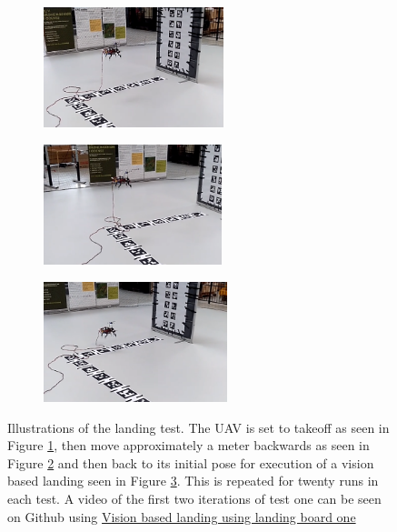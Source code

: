 \documentclass[../Head/report.tex]{subfiles}
\begin{document}
\begin{figure}[H]
    \centering
    \begin{subfigure}[t]{.30\textwidth}
        \centering
        \includegraphics[height=3.5cm]{../Figures/optitrack/optitrack_vision_landing_part_one.png}
        \caption{}
        \label{fig:optitrack_vision_based_landing_landing_station_one_part_one}
    \end{subfigure}
     \hspace{0.2em}
    \begin{subfigure}[t]{.30\textwidth}
        \centering
        \includegraphics[height=3.5cm]{../Figures/optitrack/optitrack_vision_landing_part_two.png}
        \caption{}
        \label{fig:optitrack_vision_based_landing_landing_station_one_part_two}
    \end{subfigure}
     \hspace{-0.03em}
    \begin{subfigure}[t]{.30\textwidth}
        \centering
        \includegraphics[height=3.5cm]{../Figures/optitrack/optitrack_vision_landing_part_three.png}
        \caption{}
        \label{fig:optitrack_vision_based_landing_landing_station_one_part_three}
    \end{subfigure}
    \caption{Illustrations of the landing test. The UAV is set to takeoff as seen in Figure \ref{fig:optitrack_vision_based_landing_landing_station_one_part_one}, then move approximately a meter backwards as seen in Figure \ref{fig:optitrack_vision_based_landing_landing_station_one_part_two} and then back to its initial pose for execution of a vision based landing seen in Figure \ref{fig:optitrack_vision_based_landing_landing_station_one_part_three}. This is repeated for twenty runs in each test.  A video of the first two iterations of test one can be seen on Github using \href{https://github.com/Kenil16/master\_project/blob/master/test\_videos/optitrack/optitrack\_landing\_test\_one.mp4}{Vision based landing using landing board one}}
    \label{fig:optitrack_vision_based_landing_landing_stations}
\end{figure} 
\end{document}
